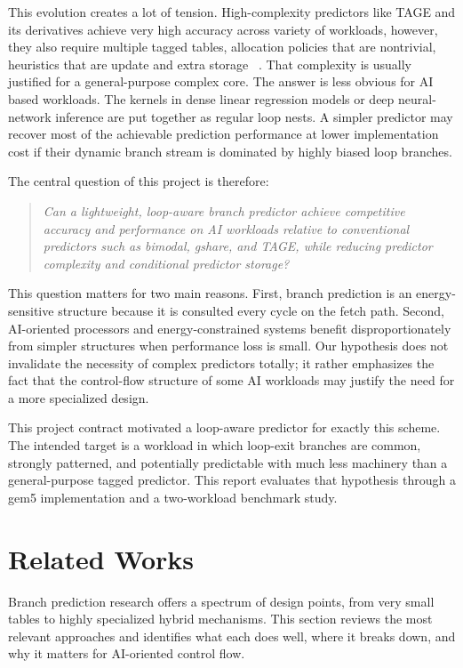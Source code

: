 \documentclass[conference]{IEEEtran}
\begin{document}
This evolution creates a lot of tension. High-complexity predictors like TAGE and its derivatives achieve very high accuracy across variety of workloads, however, they also require multiple tagged tables, allocation policies that are nontrivial, heuristics that are update and extra storage ~\cite{seznec_michaud_2006,seznec_2016}. That complexity is usually justified for a general-purpose complex core. The answer is less obvious for AI based workloads. The kernels in dense linear regression models or deep neural-network inference are put together as regular loop nests. A simpler predictor may recover most of the achievable prediction performance at lower implementation cost if their dynamic branch stream is dominated by highly biased loop branches. 

The central question of this project is therefore:
\begin{quote}
\emph{Can a lightweight, loop-aware branch predictor achieve competitive accuracy and performance on AI workloads relative to conventional predictors such as bimodal, gshare, and TAGE, while reducing predictor complexity and conditional predictor storage?}
\end{quote}

This question matters for two main reasons. First, branch prediction is an energy-sensitive structure because it is consulted every cycle on the fetch path. Second, AI-oriented processors and energy-constrained systems benefit disproportionately from simpler structures when performance loss is small. Our hypothesis does not invalidate the necessity of complex predictors totally; it rather emphasizes the fact that the control-flow structure of some AI workloads may justify the need for a more specialized design.

This project contract motivated a loop-aware predictor for exactly this scheme. The intended target is a workload in which loop-exit branches are common, strongly patterned, and potentially predictable with much less machinery than a general-purpose tagged predictor. This report evaluates that hypothesis through a gem5 implementation and a two-workload benchmark study.

\section{Related Works}
Branch prediction research offers a spectrum of design points, from very small tables to highly specialized hybrid mechanisms. This section reviews the most relevant approaches and identifies what each does well, where it breaks down, and why it matters for AI-oriented control flow.
\end{document}
